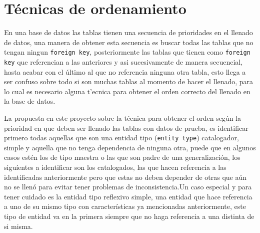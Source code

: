 \section{T\'ecnicas de ordenamiento}
En una base de datos las tablas tienen una secuencia de prioridades en el llenado de datos, una manera de obtener esta secuencia es buscar todas las tablas que no tengan ningun \texttt{foreign key}, posteriormente las tablas que tienen como \texttt{foreign key} que referencian a las anteriores y asi sucesivamente de manera secuencial, hasta acabar con el \'ultimo al que no referencia ninguna otra tabla, esto llega a ser confuso sobre todo si son muchas tablas al momento de hacer el llenado, para lo cual es necesario alguna t'ecnica para obtener el orden correcto del llenado en la base de datos.

La propuesta en este proyecto sobre la t\'ecnica para obtener el orden seg\'un la prioridad en que deben ser llenado las tablas con datos de prueba, es identificar primero todas aquellas que son una entidad tipo (\texttt{entity type}) catalogador, simple y  aquella que no tenga dependencia de ninguna otra, puede que en algunos casos est\'en los de tipo maestra  o las que son padre de una generalizaci\'on, los  sigu\'ientes a identificar son los catalogados, las que hacen referencia a las identificadas anteriormente pero que estas no deben depender de otras que a\'un no se llen\'o para evitar  tener problemas de inconsistencia.Un caso especial y para tener cuidado es la entidad tipo reflexivo simple, una entidad que hace referencia a uno de su mismo tipo con caracter\'isticas ya mencionadas anteriormente, este tipo de entidad va en la primera siempre que no haga referencia a una distinta de si misma.  
